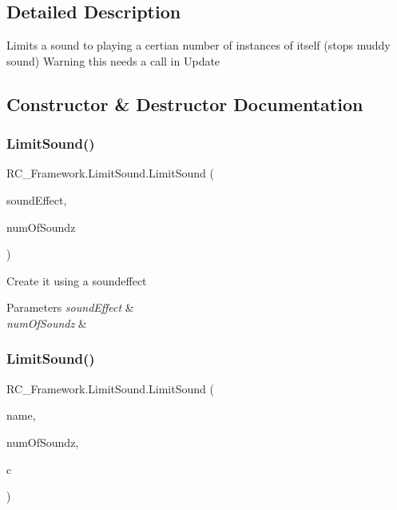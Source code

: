 \subsection{Detailed Description}
Limits a sound to playing a certian number of instances of itself (stops muddy sound) Warning this needs a call in Update 



\subsection{Constructor \& Destructor Documentation}
\mbox{\label{class_r_c___framework_1_1_limit_sound_a9cbeff174c2bb2fcaac7787b744feed8}} 
\subsubsection{\texorpdfstring{Limit\+Sound()}{LimitSound()}\hspace{0.1cm}{\footnotesize\ttfamily [1/2]}}
{\footnotesize\ttfamily R\+C\+\_\+\+Framework.\+Limit\+Sound.\+Limit\+Sound (\begin{DoxyParamCaption}\item[{Sound\+Effect}]{sound\+Effect,  }\item[{int}]{num\+Of\+Soundz }\end{DoxyParamCaption})}



Create it using a soundeffect 


\begin{DoxyParams}{Parameters}
{\em sound\+Effect} & \\
\hline
{\em num\+Of\+Soundz} & \\
\hline
\end{DoxyParams}
\mbox{\label{class_r_c___framework_1_1_limit_sound_a44dfcf8fbf1e0ba71457097f7f32176e}} 
\subsubsection{\texorpdfstring{Limit\+Sound()}{LimitSound()}\hspace{0.1cm}{\footnotesize\ttfamily [2/2]}}
{\footnotesize\ttfamily R\+C\+\_\+\+Framework.\+Limit\+Sound.\+Limit\+Sound (\begin{DoxyParamCaption}\item[{string}]{name,  }\item[{int}]{num\+Of\+Soundz,  }\item[{Content\+Manager}]{c }\end{DoxyParamCaption})}



